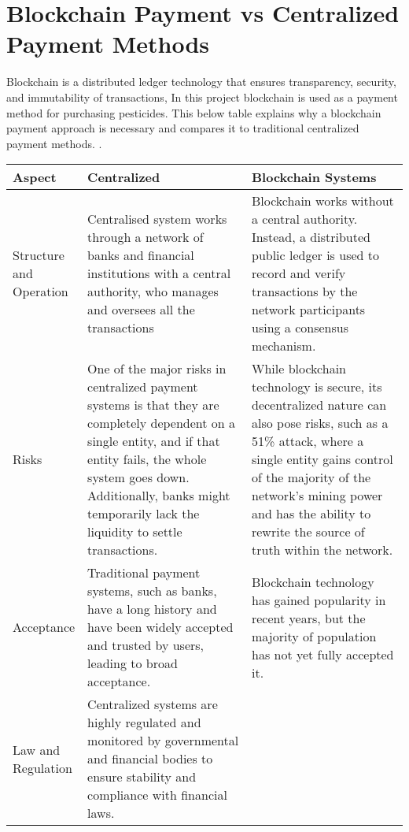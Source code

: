     
\section{Blockchain Payment vs Centralized Payment Methods}

Blockchain is a distributed ledger technology that ensures transparency, security, and immutability of transactions, In this project blockchain is used as a payment method for purchasing pesticides. This below table explains why a blockchain payment approach is necessary and compares it to traditional centralized payment methods. \cite{centralised_vs_decentralised}.


\begin{table}[H]
    \centering
    \begin{tabular}{|>{\centering\arraybackslash}p{0.12\linewidth}|p{0.45\linewidth}|p{0.45\linewidth}|} \hline 
    \textbf{Aspect} & \textbf{Centralized   } & \textbf{Blockchain Systems}\\
        \hline
        Structure and Operation  
        & 
        Centralised system works through a network of banks and financial institutions with a central authority, who manages and oversees all the transactions
        &
        Blockchain works without a central authority. Instead, a distributed public ledger is used to record and verify transactions by the network participants using a consensus mechanism.
        \\
        \hline
        Risks 
        & 
        One of the major risks in centralized payment systems is that they are completely dependent on a single entity, and if that entity fails, the whole system goes down. Additionally, banks might temporarily lack the liquidity to settle transactions.
        & 
        While blockchain technology is secure, its decentralized nature can also pose risks, such as a 51\% attack, where a single entity gains control of the majority of the network's mining power and has the ability to rewrite the source of truth within the network.
        \\
        \hline
        Acceptance 
        & 
        Traditional payment systems, such as banks, have a long history and have been widely accepted and trusted by users, leading to broad acceptance.
        & 
        Blockchain technology has gained popularity in recent years, but the majority of population has not yet fully accepted it.
        \\
        \hline
        Law and Regulation  
        & 
        Centralized systems are highly regulated and monitored by governmental and financial bodies to ensure stability and compliance with financial laws.

\end{tabular}
\end{table}
